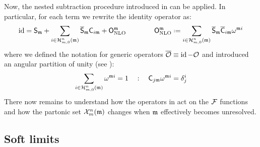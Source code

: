 
Now, the nested subtraction procedure introduced in \cite{rontsch-2017} can be applied. In particular, for each term we rewrite the identity operator as:
\begin{equation}
  \id = \so_\ur + \sum_{i \in \prt{n}{m}(\ur)} \oso_\ur \co_{i\ur} + \nlo^\ur
  \qquad \qquad
  \nlo^\ur \defeq \sum_{i \in \prt{n}{m}(\ur)} \oso_\ur \oco_{i\ur} \omega^{\ur i}
  \label{eq:nest-sub}
\end{equation}
where we defined the notation for generic operators $ \overline{\mathcal{O}} \equiv \operatorname{id} - \mathcal{O} $ and introduced an angular partition of unity (see ):
\begin{equation}
  \sum_{i \in \mathcal{H}^{n}_{m,0}(\mathfrak{m})} \omega^{\mathfrak{m} i} = 1
  \quad : \quad
  \mathsf{C}_{j\mathfrak{m}} \omega^{\mathfrak{m} i} = \delta_j^i
  \label{eq:omega-part}
\end{equation}
There now remains to understand how the operators in  act on the $ \mathcal{F} $ functions and how the partonic set $ \mathcal{X}^{n}_{m}(\mathfrak{m}) $ changes when $ \mathfrak{m} $ effectively becomes unresolved.

\subsection{Soft limits}
\label{ssec:soft-massless}

